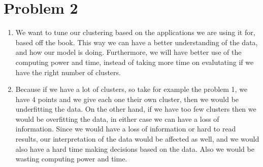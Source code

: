 \documentclass{article}
\begin{document}
\section*{Problem 2}
\begin{enumerate}[label=(\alph*)]
    \item We want to tune our clustering based on the applications we are using it for, based off the book. This way we can
    have a better understanding of the data, and how our model is doing. Furthermore, we will have better use of the computing power and time, instead of
    taking more time on evalutating if we have the right number of clusters.
    
    \item Because if we have a lot of clusters, so take for example the problem 1, we have 4 points and we give
    each one their own cluster, then we would be underfitting the data. On the other hand, if we have too few clusters
    then we would be overfitting the data, in either case we can have a loss of information. Since we would have a loss of information or hard to read results, our interpretation of the data 
    would be affected as well, and we would also have a hard time making decisions based on the data. Also we would be wasting computing power and time.
\end{enumerate}
\end{document}
